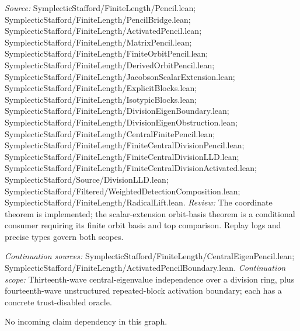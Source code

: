 \emph{Source:} SymplecticStafford/FiniteLength/Pencil.lean; SymplecticStafford/FiniteLength/PencilBridge.lean; SymplecticStafford/FiniteLength/ActivatedPencil.lean; SymplecticStafford/FiniteLength/MatrixPencil.lean; SymplecticStafford/FiniteLength/FiniteOrbitPencil.lean; SymplecticStafford/FiniteLength/DerivedOrbitPencil.lean; SymplecticStafford/FiniteLength/JacobsonScalarExtension.lean; SymplecticStafford/FiniteLength/ExplicitBlocks.lean; SymplecticStafford/FiniteLength/IsotypicBlocks.lean; SymplecticStafford/FiniteLength/DivisionEigenBoundary.lean; SymplecticStafford/FiniteLength/DivisionEigenObstruction.lean; SymplecticStafford/FiniteLength/CentralFinitePencil.lean; SymplecticStafford/FiniteLength/FiniteCentralDivisionPencil.lean; SymplecticStafford/FiniteLength/FiniteCentralDivisionLLD.lean; SymplecticStafford/FiniteLength/FiniteCentralDivisionActivated.lean; SymplecticStafford/Source/DivisionLLD.lean; SymplecticStafford/Filtered/WeightedDetectionComposition.lean; SymplecticStafford/FiniteLength/RadicalLift.lean.
\emph{Review:} The coordinate theorem is implemented; the scalar-extension orbit-basis theorem is a conditional consumer requiring its finite orbit basis and top comparison. Replay logs and precise types govern both scopes.

\emph{Continuation sources:} SymplecticStafford/FiniteLength/CentralEigenPencil.lean; SymplecticStafford/FiniteLength/ActivatedPencilBoundary.lean.
\emph{Continuation scope:} Thirteenth-wave central-eigenvalue independence over a division ring, plus fourteenth-wave unstructured repeated-block activation boundary; each has a concrete trust-disabled oracle.

No incoming claim dependency in this graph.
